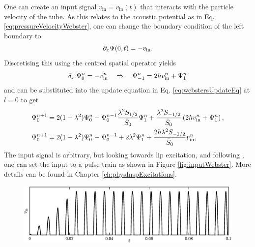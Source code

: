 One can create an input signal $v_\text{in} = v_\text{in}(t)$ that interacts with the particle velocity of the tube. As this relates to the acoustic potential as in Eq. \eqref{eq:pressureVelocityWebster}, one can change the boundary condition of the left boundary to
\begin{equation}
    \partial_x \Psi(0, t) = - v_\text{in}.
\end{equation}
Discretising this using the centred spatial operator yields
\begin{equation}
    \delta_{x\cdot} \Psi_0^n = -v_\text{in}^n \quad \Rightarrow \quad \Psi_{-1}^n = 2h v_\text{in}^n + \Psi_1^n
\end{equation}
and can be substituted into the update equation in Eq. \eqref{eq:webstersUpdateEq} at $l=0$ to get
\begin{align}
    \Psi_0^{n+1} &= 2(1-\lambda^2)\Psi_0^n-\Psi_0^{n-1} \frac{\lambda^2S_{1/2}}{\bar{S}_0}\Psi_1^n + \frac{\lambda^2S_{-1/2}}{\bar{S}_0}\left(2h v_\text{in}^n + \Psi_1^n\right),\nonumber\\
    \Psi_0^{n+1} &= 2(1-\lambda^2)\Psi_0^n-\Psi_0^{n-1} +2\lambda^2\Psi_1^n + \frac{2h\lambda^2S_{-1/2}}{\bar{S}_0} v_\text{in}^n,
\end{align}
The input signal is arbitrary, but looking towards lip excitation, and following \cite{theBible}, one can set the input to a pulse train as shown in Figure \ref{fig:inputWebster}. More details can be found in Chapter \ref{ch:physInspExcitations}.
\begin{figure}[h]
    \centering
    \includegraphics[width=\textwidth]{figures/resonators/brass/inputWebster.eps}
\end{figure}




